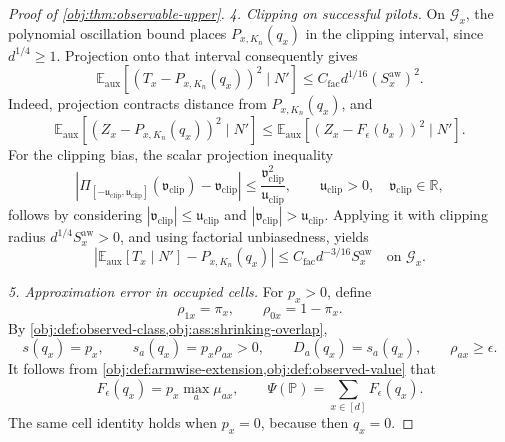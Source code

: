 \documentclass[11pt]{article}
\begin{document}
\begin{proof}[Proof of \cref{obj:thm:observable-upper}]
\textit{4. Clipping on successful pilots.}
On \(\mathcal G_x\), the polynomial oscillation bound places \(P_{x,K_n}(q_x)\) in the clipping interval, since \(d^{1/4}\ge1\). Projection onto that interval consequently gives
\[
\mathbb E_{\mathrm{aux}}
[(T_x-P_{x,K_n}(q_x))^2\mid N']
\le
C_{\mathrm{fac}}d^{1/16}(S_x^{\mathrm{aw}})^2.
\]
Indeed, projection contracts distance from \(P_{x,K_n}(q_x)\), and
\[
\mathbb E_{\mathrm{aux}}
[(Z_x-P_{x,K_n}(q_x))^2\mid N']
\le
\mathbb E_{\mathrm{aux}}
[(Z_x-F_\epsilon(b_x))^2\mid N'].
\]
For the clipping bias, the scalar projection inequality
\[
|\Pi_{[-\mathfrak u_{\mathrm{clip}},\mathfrak u_{\mathrm{clip}}]}(\mathfrak v_{\mathrm{clip}})-\mathfrak v_{\mathrm{clip}}|
\le\frac{\mathfrak v_{\mathrm{clip}}^2}{\mathfrak u_{\mathrm{clip}}},
\qquad \mathfrak u_{\mathrm{clip}}>0,\quad
\mathfrak v_{\mathrm{clip}}\in\mathbb R,
\]
follows by considering \(|\mathfrak v_{\mathrm{clip}}|\le\mathfrak u_{\mathrm{clip}}\) and \(|\mathfrak v_{\mathrm{clip}}|>\mathfrak u_{\mathrm{clip}}\). Applying it with clipping radius \(d^{1/4}S_x^{\mathrm{aw}}>0\), and using factorial unbiasedness, yields
\[
\left|
\mathbb E_{\mathrm{aux}}[T_x\mid N']-P_{x,K_n}(q_x)
\right|
\le C_{\mathrm{fac}}d^{-3/16}S_x^{\mathrm{aw}}
\quad\text{on }\mathcal G_x.
\]

\textit{5. Approximation error in occupied cells.}
For \(p_x>0\), define
\[
\rho_{1x}=\pi_x,\qquad \rho_{0x}=1-\pi_x.
\]
By \cref{obj:def:observed-class,obj:ass:shrinking-overlap},
\[
s(q_x)=p_x,\qquad
s_a(q_x)=p_x\rho_{ax}>0,\qquad
D_a(q_x)=s_a(q_x),\qquad
\rho_{ax}\ge\epsilon.
\]
It follows from \cref{obj:def:armwise-extension,obj:def:observed-value} that
\[
F_\epsilon(q_x)=p_x\max_a\mu_{ax},
\qquad
\Psi(\mathbb P)=\sum_{x\in[d]}F_\epsilon(q_x).
\]
The same cell identity holds when \(p_x=0\), because then \(q_x=0\).


\end{proof}
\end{document}
